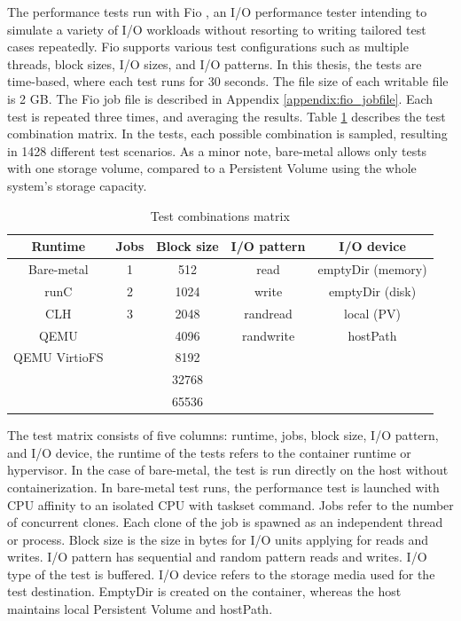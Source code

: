 The performance tests run with Fio \cite{FIO}, an I/O performance tester intending to simulate a variety of I/O workloads without resorting to writing tailored test cases repeatedly. Fio supports various test configurations such as multiple threads, block sizes, I/O sizes, and I/O patterns. In this thesis, the tests are time-based, where each test runs for 30 seconds. The file size of each writable file is 2 GB. The Fio job file is described in Appendix \ref{appendix:fio_jobfile}. Each test is repeated three times, and averaging the results. Table \ref{table:TestMatrix} describes the test combination matrix. In the tests, each possible combination is sampled, resulting in 1428 different test scenarios. As a minor note, bare-metal allows only tests with one storage volume, compared to a Persistent Volume using the whole system's storage capacity.

\begin{table}[ht]
\centering
\caption{Test combinations matrix}
\vspace{\baselineskip}
\begin{tabular}{| c | c | c | c | c |}
\hline
\textbf{Runtime} & \textbf{Jobs} & \textbf{Block size} & \textbf{I/O pattern} & \textbf{I/O device} \\ 
\hline
Bare-metal & 1 & 512 & read & emptyDir (memory) \\
\hline
runC & 2 & 1024 & write & emptyDir (disk) \\ 
\hline
CLH & 3 & 2048 & randread & local (PV) \\
\hline
QEMU & & 4096 & randwrite & hostPath \\
\hline
QEMU VirtioFS & & 8192 & & \\
\hline
& & 32768 & & \\
\hline
& & 65536 & & \\
\hline
\end{tabular}
\label{table:TestMatrix}
\end{table}

The test matrix consists of five columns: runtime, jobs, block size, I/O pattern, and I/O device, the runtime of the tests refers to the container runtime or hypervisor. In the case of bare-metal, the test is run directly on the host without containerization. In bare-metal test runs, the performance test is launched with CPU affinity to an isolated CPU with taskset \cite{taskset} command. Jobs refer to the number of concurrent clones. Each clone of the job is spawned as an independent thread or process. Block size is the size in bytes for I/O units applying for reads and writes. I/O pattern has sequential and random pattern reads and writes. I/O type of the test is buffered. I/O device refers to the storage media used for the test destination. EmptyDir is created on the container, whereas the host maintains local Persistent Volume and hostPath.

